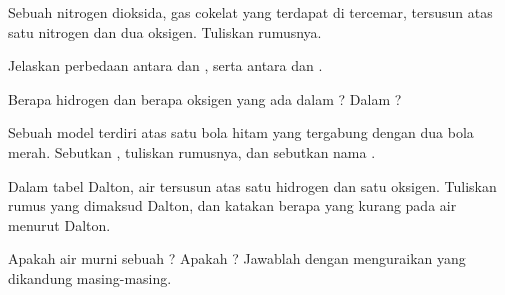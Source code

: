 \begin{exercise}[$\star$]\label{exo:g7:atoms-and-molecules:5}
Sebuah  nitrogen dioksida, gas cokelat yang terdapat di 
tercemar, tersusun atas satu  nitrogen dan dua  oksigen.
Tuliskan rumusnya.
\end{exercise}

\begin{exercise}[$\star\star$]\label{exo:g7:atoms-and-molecules:6}
Jelaskan perbedaan antara  dan , serta antara 
dan .
\end{exercise}

\begin{exercise}[$\star\star$]\label{exo:g7:atoms-and-molecules:7}
Berapa  hidrogen dan berapa  oksigen yang ada dalam
? Dalam ?
\end{exercise}

\begin{exercise}[$\star\star$]\label{exo:g7:atoms-and-molecules:8}
Sebuah model terdiri atas satu bola hitam yang tergabung dengan dua bola
merah. Sebutkan , tuliskan rumusnya, dan sebutkan nama
.
\end{exercise}

\begin{exercise}[$\star\star$]\label{exo:g7:atoms-and-molecules:9}
Dalam tabel Dalton, air tersusun atas satu  hidrogen dan satu 
oksigen. Tuliskan rumus yang dimaksud Dalton, dan katakan berapa 
yang kurang pada  air menurut Dalton.
\end{exercise}

\begin{exercise}[$\star\star$]\label{exo:g7:atoms-and-molecules:10}
Apakah air murni sebuah ? Apakah  ? Jawablah dengan
menguraikan  yang dikandung masing-masing.
\end{exercise}

